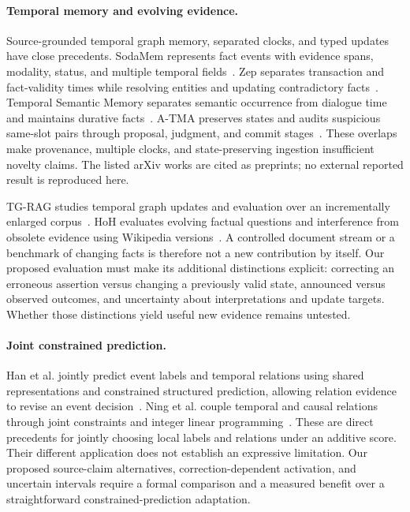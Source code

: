 \documentclass[10pt,letterpaper]{article}
\begin{document}
\paragraph{Temporal memory and evolving evidence.}
Source-grounded temporal graph memory, separated clocks, and typed updates have
close precedents. SodaMem represents fact events with evidence spans, modality,
status, and multiple temporal fields~\cite{wan2026sodamem}. Zep separates
transaction and fact-validity times while resolving entities and updating
contradictory facts~\cite{rasmussen2025zep}. Temporal Semantic Memory separates
semantic occurrence from dialogue time and maintains durative
facts~\cite{su2026temporal}. A-TMA preserves states and audits suspicious
same-slot pairs through proposal, judgment, and commit
stages~\cite{shi2026atma}. These overlaps make provenance, multiple clocks,
and state-preserving ingestion insufficient novelty claims. The listed arXiv
works are cited as preprints; no external reported result is reproduced here.

TG-RAG studies temporal graph updates and evaluation over an incrementally
enlarged corpus~\cite{han2025tgrag}. HoH evaluates evolving factual questions
and interference from obsolete evidence using Wikipedia
versions~\cite{ouyang-etal-2025-hoh}. A controlled document stream or a benchmark
of changing facts is therefore not a new contribution by itself. Our proposed
evaluation must make its additional distinctions explicit: correcting an
erroneous assertion versus changing a previously valid state, announced versus
observed outcomes, and uncertainty about interpretations and update targets.
Whether those distinctions yield useful new evidence remains untested.

\paragraph{Joint constrained prediction.}
Han et al. jointly predict event labels and temporal relations using shared
representations and constrained structured prediction, allowing relation
evidence to revise an event decision~\cite{han-etal-2019-joint}. Ning et al.
couple temporal and causal relations through joint constraints and integer
linear programming~\cite{ning-etal-2018-joint}. These are direct precedents for
jointly choosing local labels and relations under an additive score. Their
different application does not establish an expressive limitation. Our proposed
source-claim alternatives, correction-dependent activation, and uncertain
intervals require a formal comparison and a measured benefit over a
straightforward constrained-prediction adaptation.
\end{document}
